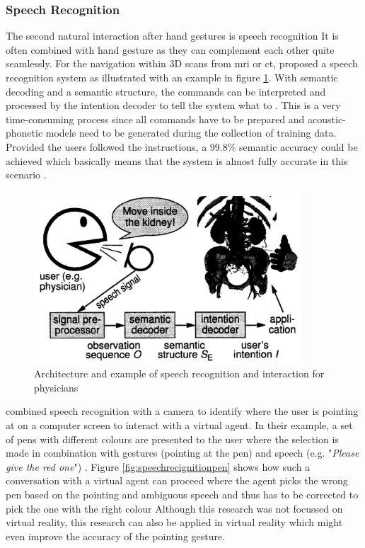 \subsubsection{Speech Recognition}

\label{SubSubSectionSpeechRecognition}

The second natural interaction after hand gestures is speech recognition It is often combined with hand gesture as they can complement each other quite seamlessly. \newline
For the navigation within 3D scans from \gls{mri} or \gls{ct}, \cite{Muller1998} proposed a speech recognition system as illustrated with an example in figure \ref{fig:speechrecognitionmedical}. With semantic decoding and a semantic structure, the commands can be interpreted and processed by the intention decoder to tell the system what to \citep{Muller1998}. This is a very time-consuming process since all commands have to be prepared and acoustic-phonetic models need to be generated during the collection of training data. Provided the users followed the instructions, a 99.8\% semantic accuracy could be achieved which basically means that the system is almost fully accurate in this scenario \citep{Muller1998}.
\begin{figure}[h]
	\begin{center}
		\includegraphics[width=10cm]{03_Figures/05_LitReview/Muller1998_SpeechRecognition.png}
		\caption[Architecture and example of speech recognition and interaction for physicians]{Architecture and example of speech recognition and interaction for physicians \citep{Muller1998}}
		\label{fig:speechrecognitionmedical}
	\end{center}
\end{figure}
\newline
\cite{Uchino2008} combined speech recognition with a camera to identify where the user is pointing at on a computer screen to interact with a virtual agent. In their example, a set of pens with different colours are presented to the user where the selection is made in combination with gestures (pointing at the pen) and speech (e.g. "\textit{Please give the red one}") \citep{Uchino2008}. Figure \ref{fig:speechrecignitionpen} shows how such a conversation with a virtual agent can proceed where the agent picks the wrong pen based on the pointing and ambiguous speech and thus has to be corrected to pick the one with the right colour Although this research was not focussed on virtual reality, this research can also be applied in virtual reality which might even improve the accuracy of the pointing gesture.
